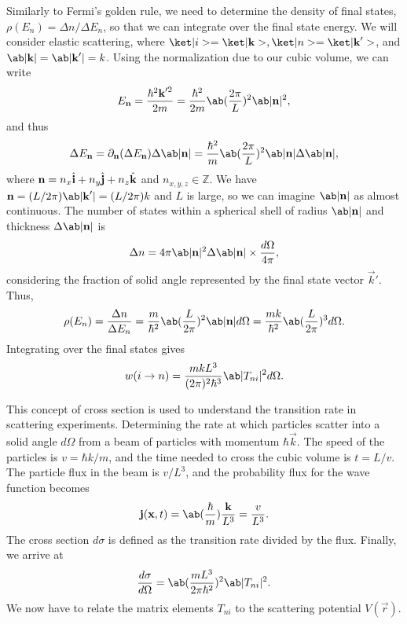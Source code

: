 Similarly to Fermi's golden rule, we need to determine the density of final states, $\rho(E_n) = \Delta n /\Delta E_n$, so that we can integrate over the final state energy. We will consider elastic scattering, where $\k{i} = \k{\vec{k}}, \k{n}=\k{\vec{k}'}$, and $\abs{\vec{k}} = \abs{\vec{k}'}= k$. Using the normalization due to our cubic volume, we can write
\begin{equation}
    E_{\vec{n}} = \frac{\hbar^2 \vec{k}'^2}{2 m} = \frac{\hbar^2}{2m} \ab (\frac{2\pi}{L})^2 \abs{\vec{n}}^2,
\end{equation}
and thus
\begin{equation}
    \Delta E_{\vec{n}} = \partial_{\vec{n}} (\Delta E_{\vec{n}}) \Delta\abs{\vec{n}} = \frac{\hbar^2}{m} \ab(\frac{2\pi}{L})^2 \abs{\vec{n}} \Delta \abs{\vec{n}},
\end{equation}
where $\bm{\mathrm{n}} = n_x \hat{\bm{\mathrm{i}}} + n_y \hat{\bm{\mathrm{j}}} + n_z \hat{\bm{\mathrm{k}}}$ and $n_{x,y,z} \in \mathbb{Z}$. We have $\vec{n} = (L/2\pi) \abs{\vec{k}'} = (L/2\pi)k$ and $L$ is large, so we can imagine $\abs{\vec{n}}$ as almost continuous. The number of states within a spherical shell of radius $\abs{\vec{n}}$ and thickness $\Delta\abs{\vec{n}}$ is 
\begin{equation}
    \Delta n = 4\pi \abs{\vec{n}}^2 \Delta \abs{\vec{n}} \times \frac{d\Omega}{4\pi},
\end{equation}
considering the fraction of solid angle represented by the final state vector $\vec{k}'$. Thus,
\begin{equation}
    \rho(E_n) = \frac{\Delta n}{\Delta E_n} = \frac{m}{\hbar^2} \ab(\frac{L}{2\pi})^2 \abs{\vec{n}} d\Omega = \frac{mk}{\hbar^2} \ab(\frac{L}{2\pi})^3 d\Omega.
\end{equation}
Integrating over the final states gives
\begin{equation}
    w(i\to n) = \frac{m k L^3}{(2\pi)^2 \hbar^3} \abs{T_{ni}}^2 d\Omega.
\end{equation}

This concept of cross section is used to understand the transition rate in scattering experiments. Determining the rate at which particles scatter into a solid angle $d\Omega$ from a beam of particles with momentum $\hbar\vec{k}$. The speed of the particles is $v = \hbar k /m$, and the time needed to cross the cubic volume is $t = L/v$. The particle flux in the beam is $v / L^3$, and the probability flux for the wave function becomes
\begin{equation}
    \vec{j}(\vec{x}, t) = \ab (\frac{\hbar}{m}) \frac{\vec{k}}{L^3} = \frac{v}{L^3}.
\end{equation}
The cross section $d\sigma$ is defined as the transition rate divided by the flux. Finally, we arrive at
\begin{equation}
    \frac{d\sigma}{d\Omega} = \ab(\frac{mL^3}{2 \pi\hbar^2})^2 \abs{T_{ni}}^2.
\end{equation}
We now have to relate the matrix elements $T_{ni}$ to the scattering potential $V(\vec{r})$.


